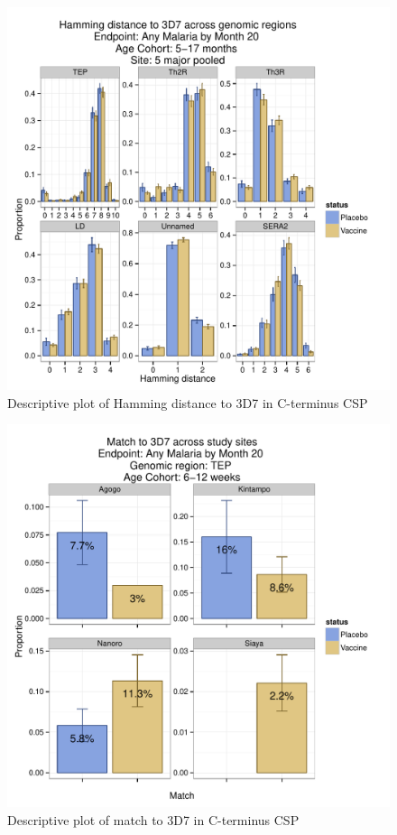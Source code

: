 \documentclass[]{article}
\begin{document}
\begin{figure}[htbp]
\centering
\includegraphics{figures/hamming-infant-x-1.pdf}
\caption{Descriptive plot of Hamming distance to 3D7 in C-terminus CSP}
\end{figure}

\begin{figure}[htbp]
\centering
\includegraphics{figures/match-newborn-sites-x-1.pdf}
\caption{Descriptive plot of match to 3D7 in C-terminus CSP}
\end{figure}
\end{document}
